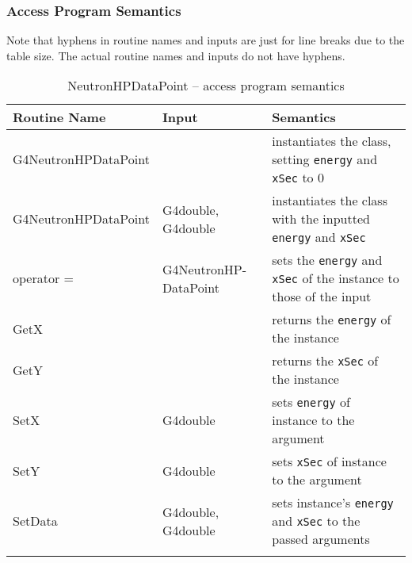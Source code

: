 \documentclass[12pt]{article}
\newcommand{\todo}[1]{\textcolor{red}{[TODO: #1]}} \else
\newcommand{\authornote}[3]{} \newcommand{\todo}[1]{} \fi
\newcommand{\mmp}[1]{\authornote{green}{MP}{#1}}
\begin{document}
\subsubsection{Access Program Semantics}%
Note that hyphens in routine names and inputs are just for line breaks due to the table size. The actual routine names and inputs do not have hyphens.

\begin{table}[H]
\caption{NeutronHPDataPoint -- access program semantics}\label{Table_NeutronHPDataPointSemantics}
\begin{tabular}{l p{} p{}}
\toprule
\bf Routine Name & \bf Input & \bf Semantics \\\midrule
\arrayrulecolor{lightgray}
G4NeutronHPDataPoint  &                      & instantiates the class, setting \texttt{energy} and \texttt{xSec} to 0\\\hline
G4NeutronHPDataPoint  & G4double, G4double   & instantiates the class with the inputted \texttt{energy} and \texttt{xSec}\\\hline
operator =                     & G4NeutronHP-DataPoint& sets the \texttt{energy} and \texttt{xSec} of the instance to those of the input \\\hline
GetX                  &                      & returns the \texttt{energy} of the instance\\\hline
GetY 				  &                      & returns the \texttt{xSec} of the instance\\\hline
SetX				  & G4double             & sets \texttt{energy} of instance to the argument\\\hline
SetY				  & G4double             & sets \texttt{xSec} of instance to the argument \\\hline
SetData				  & G4double, G4double   & sets instance's \texttt{energy} and \texttt{xSec} to the passed arguments\\
\arrayrulecolor{black}
\bottomrule
\end{tabular}
\end{table}
\mmp{commented out energy and Xsec functions since X and Y do the exact same thing. Our code no longer has those functions}
\end{document}
